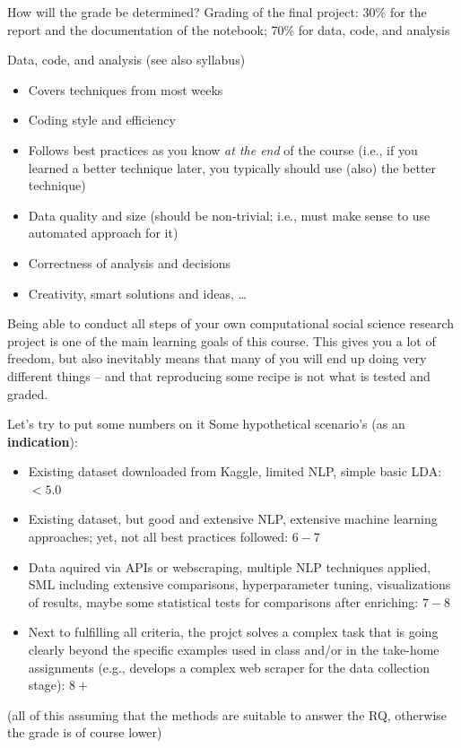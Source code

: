 \begin{frame}{How will the grade be determined?}
Grading of the final project: 30\% for the report and the documentation of the notebook; 70\% for data, code, and analysis


\begin{block}{Data, code, and analysis}
(see also syllabus)
\footnotesize
\begin{itemize}
\item Covers techniques from most weeks
\item Coding style and efficiency
\item Follows best practices as you know \emph{at the end} of the course (i.e., if you learned a better technique later, you typically should use (also) the better technique)
\item Data quality and size (should be non-trivial; i.e., must make sense to use automated approach for it)
\item Correctness of analysis and decisions
\item Creativity, smart solutions and ideas, \ldots
\end{itemize}
\end{block}

\end{frame}

\begin{frame}[standout]
Being able to conduct all steps of your own computational social science research project is one of the main learning goals of this course. This gives you a lot of freedom, but also inevitably means that many of you will end up doing very different things -- and that reproducing some recipe is not what is tested and graded.
\end{frame}

\begin{frame}{Let's try to put some numbers on it}
Some hypothetical scenario's (as an \textbf{indication}):
\footnotesize

\begin{itemize}[<+>]
\item Existing dataset downloaded from Kaggle, limited NLP, simple basic LDA: $<5.0$
\item Existing dataset, but good and extensive NLP, extensive machine learning approaches; yet, not all best practices followed: $6-7$
\item Data aquired via APIs or webscraping, multiple NLP techniques applied, SML including extensive comparisons, hyperparameter tuning, visualizations of results, maybe some statistical tests for comparisons after enriching: $7-8$
\item Next to fulfilling all criteria, the projct solves a complex task that is going clearly beyond the specific examples used in class and/or in the take-home assignments (e.g., develops a complex web scraper for the data collection stage): $8+$
\end{itemize}
(all of this assuming that the methods are suitable to answer the RQ, otherwise the grade is of course lower)
\end{frame}


